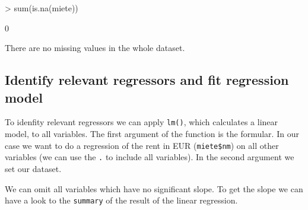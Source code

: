 \documentclass{article}
\begin{document}
\begin{Schunk}
\begin{Sinput}
> sum(is.na(miete))
\end{Sinput}
\begin{Soutput}
[1] 0
\end{Soutput}
\end{Schunk}

There are no missing values in the whole dataset.


\subsection{Identify relevant regressors and fit regression model}

To idenfity relevant regressors we can apply \texttt{lm()}, which calculates a linear model, to all variables. The first argument of the function is the formular. In our case we want to do a regression of the rent in EUR (\texttt{miete\$nm}) on all other variables (we can use the \texttt{.} to include all variables). In the second argument we set our dataset.

\begin{Schunk}
\end{Schunk}

We can omit all variables which have no significant slope. To get the slope we can have a look to the \texttt{summary} of the result of the linear regression.
\end{document}
